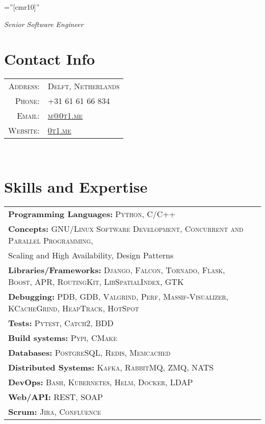 \documentclass[a4paper,11pt]{article}
\begin{document}
\pagestyle{empty}    %
\font\fb=''[cmr10]'' %

\par {\bigskip \emph{Senior Software Engineer} \par}

\section{Contact Info}
\begin{tabular}{rl}

    \textsc{Address:}     & \textsc{Delft, Netherlands}\\
    \textsc{Phone:}       & \textsc{+31 61 61 66 834}\\
    \textsc{Email:}       & \textsc{\href{mailto:m@0t1.me}{m@0t1.me}}\\
    \textsc{Website:}     & \textsc{\href{https://0t1.me/}{0t1.me}}\\

\end{tabular}\\

\section{Skills and Expertise}
\begin{tabular}{lr}

    \textbf{Programming Languages:} \textsc{Python, C/C++}\\
    \textbf{Concepts:} \textsc{GNU/Linux Software Development, Concurrent and Parallel Programming,}\\
    {Scaling and High Availability, Design Patterns}\\
    \textbf{Libraries/Frameworks:} \textsc{Django, Falcon, Tornado, Flask, Boost, APR, RoutingKit, LibSpatialIndex, GTK}\\
    \textbf{Debugging:} \textsc{PDB, GDB, Valgrind, Perf, Massif-Visualizer, KCacheGrind, HeapTrack, HotSpot}\\
    \textbf{Tests:} \textsc{Pytest, Catch2, BDD}\\
    \textbf{Build systems:} \textsc{Pypi, CMake}\\
    \textbf{Databases:} \textsc{PostgreSQL, Redis, Memcached}\\
    \textbf{Distributed Systems:} \textsc{Kafka, RabbitMQ, ZMQ, NATS}\\
    \textbf{DevOps:} \textsc{Bash, Kubernetes, Helm, Docker, LDAP}\\
    \textbf{Web/API:} \textsc{REST, SOAP}\\
    \textbf{Scrum:} \textsc{Jira, Confluence}

\end{tabular}\\
\end{document}
